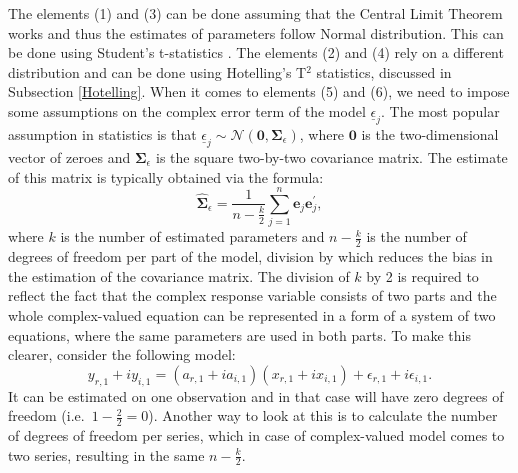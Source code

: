 \documentclass[
]{book}
\begin{document}
The elements (1) and (3) can be done assuming that the Central Limit Theorem works and thus the estimates of parameters follow Normal distribution. This can be done using Student's t-statistics \citep[for example, as discussed in Section 6.4 and 8.1 of][]{SvetunkovSBA}. The elements (2) and (4) rely on a different distribution and can be done using Hotelling's T\(^2\) statistics, discussed in Subsection \ref{Hotelling}. When it comes to elements (5) and (6), we need to impose some assumptions on the complex error term of the model \(\underline{\epsilon}_j\). The most popular assumption in statistics is that \(\underline{\epsilon}_j \sim \mathcal{N}(\boldsymbol{0}, \boldsymbol{\Sigma}_\epsilon)\), where \(\boldsymbol{0}\) is the two-dimensional vector of zeroes and \(\boldsymbol{\Sigma}_\epsilon\) is the square two-by-two covariance matrix. The estimate of this matrix is typically obtained via the formula:
\begin{equation*}
    \hat{\boldsymbol{\Sigma}}_\epsilon = \frac{1}{n-\frac{k}{2}} \sum_{j=1}^{n} \boldsymbol{e}_j \boldsymbol{e}_j^\prime ,
\end{equation*}
where \(k\) is the number of estimated parameters and \(n-\frac{k}{2}\) is the number of degrees of freedom per part of the model, division by which reduces the bias in the estimation of the covariance matrix. The division of \(k\) by 2 is required to reflect the fact that the complex response variable consists of two parts and the whole complex-valued equation can be represented in a form of a system of two equations, where the same parameters are used in both parts. To make this clearer, consider the following model:
\begin{equation*}
    y_{r,1} + i y_{i,1} = (a_{r,1} + i a_{i,1}) (x_{r,1} + i x_{i,1}) + \epsilon_{r,1} + i \epsilon_{i,1} .
\end{equation*}
It can be estimated on one observation and in that case will have zero degrees of freedom (i.e.~\(1-\frac{2}{2}=0\)). Another way to look at this is to calculate the number of degrees of freedom per series, which in case of complex-valued model comes to two series, resulting in the same \(n-\frac{k}{2}\).
\end{document}
